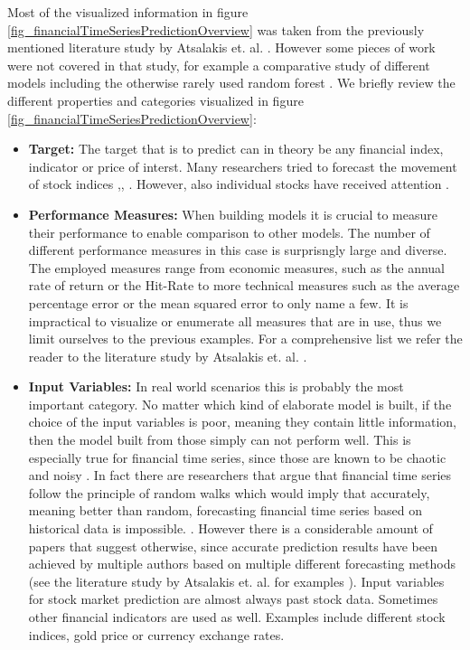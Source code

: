 Most of the visualized information in figure \ref{fig_financialTimeSeriesPredictionOverview} was taken from the previously mentioned literature study by Atsalakis et. al. \cite{atsalakis2009surveying}. However  some pieces of work were not covered in that study, for example a comparative study of different models including the otherwise rarely used random forest \cite{kumar2006forecasting}. We briefly review the different properties and categories visualized in figure 
\ref{fig_financialTimeSeriesPredictionOverview}:

\begin{itemize}
	\item \textbf{Target:} The target that is to predict can in theory be any financial index, indicator or price of interst. Many researchers tried to forecast the movement of stock indices \cite{zhang2009stock},\cite{van2001financial}, \cite{kumar2006forecasting} . However, also individual stocks have received attention \cite{mahfoud1996financial}. 
	\item \textbf{Performance Measures:} When building models it is crucial to measure their performance to enable comparison to other models. The number of different performance measures in this case is surprisngly large and diverse. The employed measures range from economic measures, such as the annual rate of return or the Hit-Rate to more technical measures such as the average percentage error or the mean squared error to only name a few. It is impractical to visualize or enumerate all measures that are in use, thus we limit ourselves to the previous examples. For a comprehensive list we refer the reader to the literature study by Atsalakis et. al. \cite{atsalakis2009surveying}.
	\item \textbf{Input Variables:} In real world scenarios this is probably the most important category. No matter which kind of elaborate model is built, if the choice of the input variables is poor, meaning they contain little information, then the model built from those simply can not perform well. This is especially true for financial time series, since those are known to be chaotic and noisy \cite{zhang2009stock}. In fact there are researchers that argue that financial time series follow the principle of random walks which would imply that accurately, meaning better than random, forecasting financial time series based on historical data is impossible. \cite{fama1965behavior}. However there is a considerable amount of papers that suggest otherwise, since accurate prediction results have been achieved by multiple authors based on multiple different forecasting methods (see the literature study by Atsalakis et. al. for examples \cite{atsalakis2009surveying} ). Input variables for stock market prediction are almost always past stock data. Sometimes other financial indicators are used as well. Examples include different stock indices, gold price or currency exchange rates.

\end{itemize}
